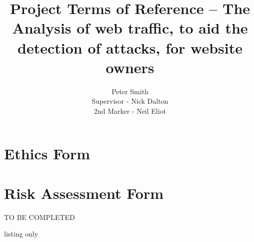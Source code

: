 \documentclass[12pt]{article}
\title{Project Terms of Reference -- The Analysis of web traffic, to aid the detection of attacks, for website owners}
\author{Peter Smith \\
\small Supervisor - Nick Dalton\\
\small 2nd Marker - Neil Eliot
}
\begin{document}
\maketitle


\printbibliography
\appendix
\newpage
\section{Ethics Form}





\section{Risk Assessment Form}
TO BE COMPLETED
\begin{tcblisting}{listing only}
%
\end{tcblisting}
\end{document}
